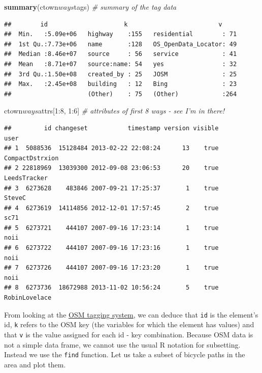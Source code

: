 \documentclass[]{article}
\newenvironment{Shaded}{}{}
\newcommand{\KeywordTok}[1]{\textcolor[rgb]{0.00,0.44,0.13}{\textbf{{#1}}}}
\newcommand{\DecValTok}[1]{\textcolor[rgb]{0.25,0.63,0.44}{{#1}}}
\newcommand{\CommentTok}[1]{\textcolor[rgb]{0.38,0.63,0.69}{\textit{{#1}}}}
\newcommand{\NormalTok}[1]{{#1}}
\begin{document}
\begin{Shaded}
\begin{Highlighting}[]
\KeywordTok{summary}\NormalTok{(ctown$ways$tags)  }\CommentTok{# summary of the tag data}
\end{Highlighting}
\end{Shaded}
\begin{verbatim}
##        id                     k                         v      
##  Min.   :5.09e+06   highway    :155   residential        : 71  
##  1st Qu.:7.73e+06   name       :128   OS_OpenData_Locator: 49  
##  Median :8.46e+07   source     : 56   service            : 41  
##  Mean   :8.71e+07   source:name: 54   yes                : 32  
##  3rd Qu.:1.50e+08   created_by : 25   JOSM               : 25  
##  Max.   :2.45e+08   building   : 12   Bing               : 23  
##                     (Other)    : 75   (Other)            :264
\end{verbatim}
\begin{Shaded}
\begin{Highlighting}[]
\NormalTok{ctown$ways$attrs[}\DecValTok{1}\NormalTok{:}\DecValTok{8}\NormalTok{, }\DecValTok{1}\NormalTok{:}\DecValTok{6}\NormalTok{]  }\CommentTok{# attributes of first 8 ways - see I'm in there!}
\end{Highlighting}
\end{Shaded}
\begin{verbatim}
##         id changeset           timestamp version visible            user
## 1  5088536  15128484 2013-02-22 22:08:24      13    true CompactDstrxion
## 2 22818969  13039300 2012-09-08 23:06:53      20    true    LeedsTracker
## 3  6273628    483846 2007-09-21 17:25:37       1    true          SteveC
## 4  6273619  14114856 2012-12-01 17:57:45       2    true            sc71
## 5  6273721    444107 2007-09-16 17:23:14       1    true            noii
## 6  6273722    444107 2007-09-16 17:23:16       1    true            noii
## 7  6273726    444107 2007-09-16 17:23:20       1    true            noii
## 8  6273736  18672988 2013-11-02 10:56:24       5    true   RobinLovelace
\end{verbatim}
From looking at the \href{http://wiki.openstreetmap.org/wiki/Tags}{OSM
tagging system}, we can deduce that \texttt{id} is the element's id,
\texttt{k} refers to the OSM key (the variables for which the element
has values) and that \texttt{v} is the value assigned for each id - key
combination. Because OSM data is not a simple data frame, we cannot use
the usual R notation for subsetting. Instead we use the \texttt{find}
function. Let us take a subset of bicycle paths in the area and plot
them.
\end{document}
